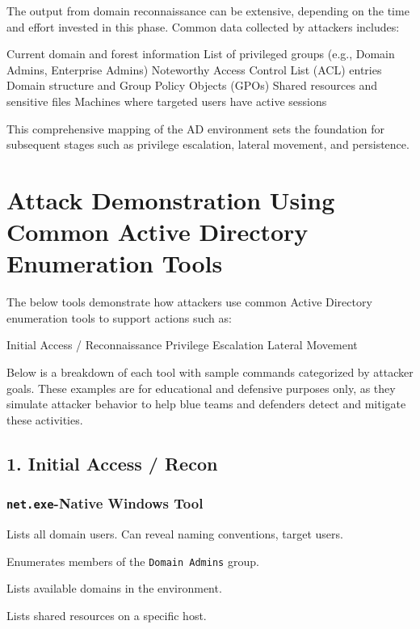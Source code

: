 {The output from domain reconnaissance can be extensive, depending on the time and effort invested in this phase. Common data collected by attackers includes:

Current domain and forest information
List of privileged groups (e.g., Domain Admins, Enterprise Admins)
Noteworthy Access Control List (ACL) entries
Domain structure and Group Policy Objects (GPOs)
Shared resources and sensitive files
Machines where targeted users have active sessions

This comprehensive mapping of the AD environment sets the foundation for subsequent stages such as privilege escalation, lateral movement, and persistence.

\section{Attack Demonstration Using Common Active Directory Enumeration Tools}
The below tools demonstrate how attackers use common Active Directory enumeration tools to support actions such as:

Initial Access / Reconnaissance
Privilege Escalation
Lateral Movement

Below is a breakdown of each tool with sample commands categorized by attacker goals. These examples are for educational and defensive purposes only, as they simulate attacker behavior to help blue teams and defenders detect and mitigate these activities.

\subsection{1. Initial Access / Recon}
\subsubsection{\texttt{net.exe}-Native Windows Tool}

Lists all domain users. Can reveal naming conventions, target users.

Enumerates members of the \texttt{Domain Admins} group.

Lists available domains in the environment.

Lists shared resources on a specific host.

}
